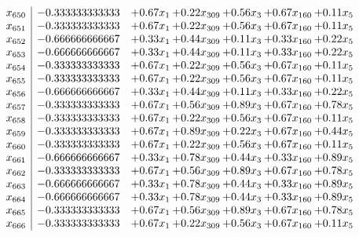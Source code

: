 \documentclass[8pt]{article}
\begin{document}
\[\begin{array}{c| c c@{\hskip 2pt} c@{\hskip 2pt} c@{\hskip 2pt} c@{\hskip 2pt} c@{\hskip 2pt} }
 x_{650}   &  -0.333333333333 & +  0.67 x_{1} & +  0.22 x_{309} & +  0.56 x_{3} & +  0.67 x_{160} & +  0.11 x_{5}\\
 x_{651}   &  -0.333333333333 & +  0.67 x_{1} & +  0.22 x_{309} & +  0.56 x_{3} & +  0.67 x_{160} & +  0.11 x_{5}\\
 x_{652}   &  -0.666666666667 & +  0.33 x_{1} & +  0.44 x_{309} & +  0.11 x_{3} & +  0.33 x_{160} & +  0.22 x_{5}\\
 x_{653}   &  -0.666666666667 & +  0.33 x_{1} & +  0.44 x_{309} & +  0.11 x_{3} & +  0.33 x_{160} & +  0.22 x_{5}\\
 x_{654}   &  -0.333333333333 & +  0.67 x_{1} & +  0.22 x_{309} & +  0.56 x_{3} & +  0.67 x_{160} & +  0.11 x_{5}\\
 x_{655}   &  -0.333333333333 & +  0.67 x_{1} & +  0.22 x_{309} & +  0.56 x_{3} & +  0.67 x_{160} & +  0.11 x_{5}\\
 x_{656}   &  -0.666666666667 & +  0.33 x_{1} & +  0.44 x_{309} & +  0.11 x_{3} & +  0.33 x_{160} & +  0.22 x_{5}\\
 x_{657}   &  -0.333333333333 & +  0.67 x_{1} & +  0.56 x_{309} & +  0.89 x_{3} & +  0.67 x_{160} & +  0.78 x_{5}\\
 x_{658}   &  -0.333333333333 & +  0.67 x_{1} & +  0.22 x_{309} & +  0.56 x_{3} & +  0.67 x_{160} & +  0.11 x_{5}\\
 x_{659}   &  -0.333333333333 & +  0.67 x_{1} & +  0.89 x_{309} & +  0.22 x_{3} & +  0.67 x_{160} & +  0.44 x_{5}\\
 x_{660}   &  -0.333333333333 & +  0.67 x_{1} & +  0.22 x_{309} & +  0.56 x_{3} & +  0.67 x_{160} & +  0.11 x_{5}\\
 x_{661}   &  -0.666666666667 & +  0.33 x_{1} & +  0.78 x_{309} & +  0.44 x_{3} & +  0.33 x_{160} & +  0.89 x_{5}\\
 x_{662}   &  -0.333333333333 & +  0.67 x_{1} & +  0.56 x_{309} & +  0.89 x_{3} & +  0.67 x_{160} & +  0.78 x_{5}\\
 x_{663}   &  -0.666666666667 & +  0.33 x_{1} & +  0.78 x_{309} & +  0.44 x_{3} & +  0.33 x_{160} & +  0.89 x_{5}\\
 x_{664}   &  -0.666666666667 & +  0.33 x_{1} & +  0.78 x_{309} & +  0.44 x_{3} & +  0.33 x_{160} & +  0.89 x_{5}\\
 x_{665}   &  -0.333333333333 & +  0.67 x_{1} & +  0.56 x_{309} & +  0.89 x_{3} & +  0.67 x_{160} & +  0.78 x_{5}\\
 x_{666}   &  -0.333333333333 & +  0.67 x_{1} & +  0.22 x_{309} & +  0.56 x_{3} & +  0.67 x_{160} & +  0.11 x_{5}\\

\end{array}\]
\end{document}
